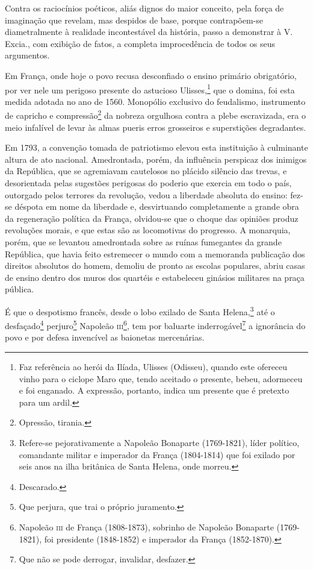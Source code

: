 Contra os raciocínios poéticos, aliás dignos do maior conceito, pela
força de imaginação que revelam, mas despidos de base, porque
contrapõem-se diametralmente à realidade incontestável da história,
passo a demonstrar à V.\,Excia., com exibição de fatos, a completa
improcedência de todos os seus argumentos.

Em França, onde hoje o povo recusa desconfiado o ensino primário
obrigatório, por ver nele um perigoso presente do astucioso
Ulisses,\footnote{Faz referência ao herói da Ilíada, Ulisses (Odisseu),
  quando este ofereceu vinho para o ciclope Maro que, tendo aceitado o
  presente, bebeu, adormeceu e foi enganado. A expressão, portanto,
  indica um presente que é pretexto para um ardil.} que o domina, foi
esta medida adotada no ano de 1560. Monopólio exclusivo do feudalismo,
instrumento de capricho e compressão\footnote{Opressão, tirania.} da
nobreza orgulhosa contra a plebe escravizada, era o meio infalível de
levar às almas pueris erros grosseiros e superstições degradantes.

Em 1793, a convenção tomada de patriotismo elevou esta instituição à
culminante altura de ato nacional. Amedrontada, porém, da influência
perspicaz dos inimigos da República, que se agremiavam cautelosos no
plácido silêncio das trevas, e desorientada pelas sugestões perigosas do
poderio que exercia em todo o país, outorgado pelos terrores da
revolução, vedou a liberdade absoluta do ensino: fez-se déspota em nome
da liberdade e, desvirtuando completamente a grande obra da regeneração
política da França, olvidou-se que o choque das opiniões produz
revoluções morais, e que estas são as locomotivas do progresso. A
monarquia, porém, que se levantou amedrontada sobre as ruínas fumegantes
da grande República, que havia feito estremecer o mundo com a memoranda
publicação dos direitos absolutos do homem, demoliu de pronto as escolas
populares, abriu casas de ensino dentro dos muros dos quartéis e
estabeleceu ginásios militares na praça pública.

É que o despotismo francês, desde o lobo exilado de Santa
Helena,\footnote{Refere-se pejorativamente a Napoleão Bonaparte
  (1769-1821), líder político, comandante militar e imperador da França
  (1804-1814) que foi exilado por seis anos na ilha britânica de Santa
  Helena, onde morreu.} até o desfaçado\footnote{Descarado.}
perjuro\footnote{Que perjura, que trai o próprio juramento.} Napoleão
\textsc{iii}\footnote{Napoleão \textsc{iii} de França (1808-1873), sobrinho de Napoleão
  Bonaparte (1769-1821), foi presidente (1848-1852) e imperador da
  França (1852-1870).}, tem por baluarte inderrogável\footnote{Que não
  se pode derrogar, invalidar, desfazer.} a ignorância do povo e por
defesa invencível as baionetas mercenárias.


